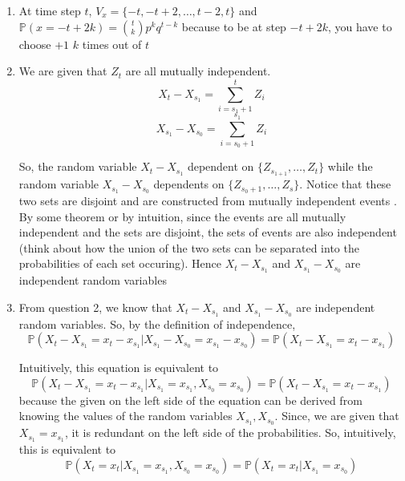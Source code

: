 \documentclass[12pt]{article}
\begin{document}

\begin{enumerate}[start=1,label={\bfseries Problem \arabic*:},leftmargin=1in] %
    \item At time step $t$, $V_{x} = \{ -t, -t + 2, \dots, t-2, t\}$ and $\mathbb{P}(x = -t + 2k) = \binom{t}{k}p^{k}q^{t-k}$ because to be at step $-t + 2k$, you have to choose $+1$ $k$ times out of $t$ 
    
    \item We are given that $Z_{t}$ are all mutually independent. 
    \[
        X_{t} - X_{s_{1}} = \sum^{t}_{{i = s_{1} + 1}} Z_{i}
    \]
    \[
        X_{s_{1}} - X_{s_{0}} = \sum^{s_{1}}_{i=s_{0}+1}Z_{i}
    \]

    So, the random variable $X_{t} - X_{s_{1}}$ dependent on $\{ Z_{s_{1+1}}, \dots, Z_t\}$ 
    while the random variable $X_{s_{1}} - X_{s_{0}}$ dependents on $\{ Z_{s_{0}+1}, \dots, Z_{s}\}$. Notice that these two sets are 
    disjoint and are constructed from mutually independent events . By some theorem or by intuition, since the events are all mutually independent and the sets are disjoint, 
    the sets of events are also independent (think about how the union of the two sets can be separated into the probabilities of each set occuring). Hence $X_{t} - X_{s_{1}}$ and $X_{s_{1}} - X_{s_{0}}$ are independent random variables

    \item From question 2, we know that $X_{t} - X_{s_{1}}$ and $X_{s_{1}} - X_{s_{0}}$ are independent random variables. So, by the definition of independence, 
    \[\mathbb{P}(X_{t}-X_{s_{1}} = x_{t} - x_{s_{1}} | X_{s_{1}} - X_{s_{0}} = x_{s_{1}} - x_{s_{0}}) = \mathbb{P}(X_{t}-X_{s_{1}} = x_{t} - x_{s_{1}})\]

    Intuitively, this equation is equivalent to 
    \[
        \mathbb{P}(X_{t}-X_{s_{1}} = x_{t} - x_{s_{1}} | X_{s_{1}} = x_{s_{1}},  X_{s_{0}} = x_{s_{0}}) = \mathbb{P}(X_{t}-X_{s_{1}} = x_{t} - x_{s_{1}})
    \]
    because the given on the left side of the equation can be derived from knowing the values of the random variables $X_{s_{1}}, X_{s_{0}}$. 
    Since, we are given that $X_{s_{1}} = x_{s_{1}}$, it is redundant on the left side of the probabilities. So, intuitively, this is equivalent to 
    \[
        \mathbb{P}(X_{t} = x_{t} | X_{s_{1}} = x_{s_{1}},  X_{s_{0}} = x_{s_{0}}) = \mathbb{P}(X_{t} = x_{t} | X_{s_{1}} = x_{s_{0}})
    \]
    


\end{enumerate}
\end{document}
